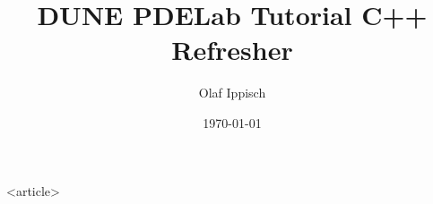 \usepackage[english]{babel}
\usepackage[utf8]{inputenc}
\usepackage{lmodern}
\usepackage{amsmath,amssymb,amsfonts}


\usepackage{multicol}
\usepackage{enumerate}
\usepackage{color}
\usepackage{stmaryrd}
\usepackage{lmodern}

\title{DUNE PDELab Tutorial C++ Refresher}
\author{Olaf Ippisch}
\date[\today]{\today}




%
%



\begin{onlyenv}<article>
\maketitle
\end{onlyenv}



